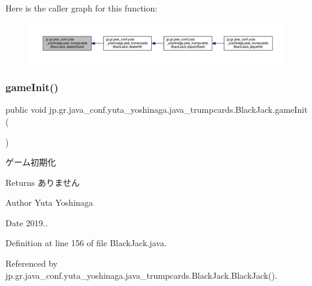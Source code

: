 Here is the caller graph for this function\+:
\nopagebreak
\begin{figure}[H]
\begin{center}
\leavevmode
\includegraphics[width=350pt]{classjp_1_1gr_1_1java__conf_1_1yuta__yoshinaga_1_1java__trumpcards_1_1_black_jack_a49f2f12998ffa9892f4e8212f85afc7f_icgraph}
\end{center}
\end{figure}
\mbox{\label{classjp_1_1gr_1_1java__conf_1_1yuta__yoshinaga_1_1java__trumpcards_1_1_black_jack_aecf1c840d9643b4809cd5e93710256a4}} 
\subsubsection{\texorpdfstring{game\+Init()}{gameInit()}}
{\footnotesize\ttfamily public void jp.\+gr.\+java\+\_\+conf.\+yuta\+\_\+yoshinaga.\+java\+\_\+trumpcards.\+Black\+Jack.\+game\+Init (\begin{DoxyParamCaption}{ }\end{DoxyParamCaption})}



ゲーム初期化 

\begin{DoxyReturn}{Returns}
ありません 
\end{DoxyReturn}
\begin{DoxyAuthor}{Author}
Yuta Yoshinaga 
\end{DoxyAuthor}
\begin{DoxyDate}{Date}
2019.. 
\end{DoxyDate}


Definition at line 156 of file Black\+Jack.\+java.



Referenced by jp.\+gr.\+java\+\_\+conf.\+yuta\+\_\+yoshinaga.\+java\+\_\+trumpcards.\+Black\+Jack.\+Black\+Jack().

